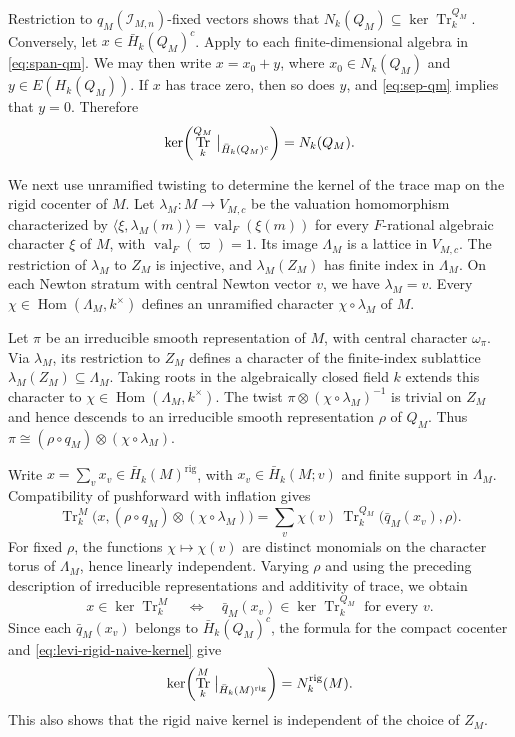 \documentclass[11pt,letterpaper]{amsart}
\theoremstyle{definition}
\numberwithin{equation}{section}
\numberwithin{theorem}{section}
\newcommand{\kk}{k}
\newcommand{\CI}{\mathcal I}
\newcommand{\rig}{\mathrm{rig}}
\DeclareMathOperator{\Tr}{Tr}
\DeclareMathOperator{\Hom}{Hom}
\begin{document}
Restriction to $q_M(\CI_{M,n})$-fixed vectors shows
that $N_\kk(Q_M)\subseteq\ker\Tr_\kk^{Q_M}$.
Conversely, let $x\in\bar H_\kk(Q_M)^c$.
Apply  to each finite-dimensional algebra
in \eqref{eq:span-qm}. We may then write $x=x_0+y$,
where $x_0\in N_\kk(Q_M)$ and $y\in E(H_\kk(Q_M))$.
If $x$ has trace zero, then so does $y$, and \eqref{eq:sep-qm} implies that $y=0$. Therefore
\[
 \ker\!\left(
   \Tr_\kk^{Q_M}\bigm|_{\bar H_\kk(Q_M)^c}
 \right)=N_\kk(Q_M).
\]

We next use unramified twisting to determine the kernel of the trace map on the rigid cocenter of $M$. Let $\lambda_M:M\to V_{M,c}$ be
the valuation homomorphism characterized by
$\langle\xi,\lambda_M(m)\rangle
=\operatorname{val}_F(\xi(m))$
for every $F$-rational algebraic character $\xi$ of $M$,
with $\operatorname{val}_F(\varpi)=1$.
Its image $\Lambda_M$ is a lattice in $V_{M,c}$.
The restriction of $\lambda_M$ to $Z_M$ is injective,
and $\lambda_M(Z_M)$ has finite index in $\Lambda_M$.
On each Newton stratum with central Newton vector $v$,
we have $\lambda_M=v$. Every
$\chi\in\Hom(\Lambda_M,\kk^\times)$ defines an
unramified character $\chi\circ\lambda_M$ of $M$.

Let $\pi$ be an irreducible smooth representation of $M$,
with central character $\omega_\pi$.
Via $\lambda_M$, its restriction to $Z_M$ defines a character
of the finite-index sublattice $\lambda_M(Z_M)\subseteq\Lambda_M$.
Taking roots in the algebraically closed field $\kk$ extends
this character to $\chi\in\Hom(\Lambda_M,\kk^\times)$.
The twist $\pi\otimes(\chi\circ\lambda_M)^{-1}$ is trivial
on $Z_M$ and hence descends to an irreducible smooth
representation $\rho$ of $Q_M$. Thus $\pi\cong(\rho\circ q_M)\otimes(\chi\circ\lambda_M)$.

Write $x=\sum_v x_v\in\bar H_\kk(M)^{\rig}$, with
$x_v\in\bar H_\kk(M;v)$ and finite support in
$\Lambda_M$. Compatibility of pushforward with
inflation gives
\[
 \Tr_\kk^M\bigl(
   x,(\rho\circ q_M)\otimes(\chi\circ\lambda_M)
 \bigr)
 =\sum_v\chi(v)\,
    \Tr_\kk^{Q_M}\bigl(\bar q_M(x_v),\rho\bigr).
\]
For fixed $\rho$, the functions $\chi\mapsto\chi(v)$ are distinct monomials on the character torus of $\Lambda_M$, hence linearly independent.
Varying $\rho$ and using the preceding description of
irreducible representations and additivity of trace,
we obtain
\[
 x\in\ker\Tr_\kk^M
 \quad\Longleftrightarrow\quad
 \bar q_M(x_v)\in\ker\Tr_\kk^{Q_M}
 \text{ for every }v.
\]
Since each $\bar q_M(x_v)$ belongs to $\bar H_\kk(Q_M)^c$, the formula for the compact cocenter and \eqref{eq:levi-rigid-naive-kernel} give
\[
 \ker\!\left(
   \Tr_\kk^M\bigm|_{\bar H_\kk(M)^{\rig}}
 \right)=N_\kk^{\rig}(M).
\]
This also shows that the rigid naive kernel is independent of the choice of $Z_M$.
\end{document}
